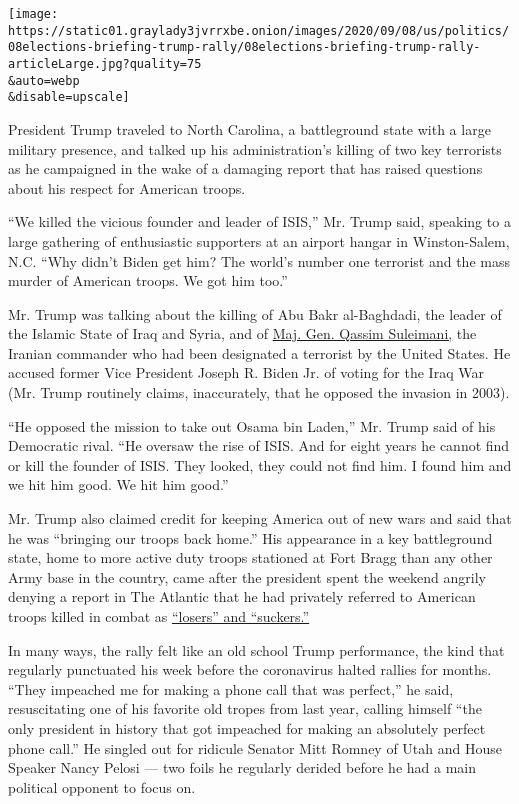 \texttt{[image: https://static01.graylady3jvrrxbe.onion/images/2020/09/08/us/politics/08elections-briefing-trump-rally/08elections-briefing-trump-rally-articleLarge.jpg?quality=75\\\&auto=webp\\\&disable=upscale]}

President Trump traveled to North Carolina, a battleground state with a
large military presence, and talked up his administration's killing of
two key terrorists as he campaigned in the wake of a damaging report
that has raised questions about his respect for American troops.

``We killed the vicious founder and leader of ISIS,'' Mr. Trump said,
speaking to a large gathering of enthusiastic supporters at an airport
hangar in Winston-Salem, N.C. ``Why didn't Biden get him? The world's
number one terrorist and the mass murder of American troops. We got him
too.''

Mr. Trump was talking about the killing of Abu Bakr al-Baghdadi, the
leader of the Islamic State of Iraq and Syria, and of
\href{https://www.nytimes3xbfgragh.onion/2020/01/03/world/middleeast/suleimani-dead.html}{Maj.
Gen. Qassim Suleimani,} the Iranian commander who had been designated a
terrorist by the United States. He accused former Vice President Joseph
R. Biden Jr. of voting for the Iraq War (Mr. Trump routinely claims,
inaccurately, that he opposed the invasion in 2003).

``He opposed the mission to take out Osama bin Laden,'' Mr. Trump said
of his Democratic rival. ``He oversaw the rise of ISIS. And for eight
years he cannot find or kill the founder of ISIS. They looked, they
could not find him. I found him and we hit him good. We hit him good.''

Mr. Trump also claimed credit for keeping America out of new wars and
said that he was ``bringing our troops back home.'' His appearance in a
key battleground state, home to more active duty troops stationed at
Fort Bragg than any other Army base in the country, came after the
president spent the weekend angrily denying a report in The Atlantic
that he had privately referred to American troops killed in combat as
\href{https://www.nytimes3xbfgragh.onion/2020/09/04/us/politics/trump-veterans-losers.html}{``losers''
and ``suckers.''}

In many ways, the rally felt like an old school Trump performance, the
kind that regularly punctuated his week before the coronavirus halted
rallies for months. ``They impeached me for making a phone call that was
perfect,'' he said, resuscitating one of his favorite old tropes from
last year, calling himself ``the only president in history that got
impeached for making an absolutely perfect phone call.'' He singled out
for ridicule Senator Mitt Romney of Utah and House Speaker Nancy Pelosi
--- two foils he regularly derided before he had a main political
opponent to focus on.

